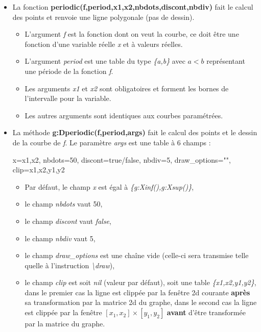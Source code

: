 \begin{itemize}
\item La fonction \textbf{periodic(f,period,x1,x2,nbdots,discont,nbdiv)} fait le calcul des points et renvoie une ligne polygonale (pas de dessin).

  \begin{itemize}
    \item L'argument \emph{f} est la fonction dont on veut la courbe, ce doit être une fonction d'une variable réelle \emph{x} et à valeurs réelles.
    \item L'argument \emph{period} est une table du type \emph{\{a,b\}} avec \(a<b\) représentant une période de la fonction \emph{f}.
    \item Les arguments \emph{x1} et \emph{x2} sont obligatoires et forment les bornes de l'intervalle pour la variable.
    \item Les autres arguments sont identiques aux courbes paramétrées.
  \end{itemize}
\item La méthode \textbf{g:Dperiodic(f,period,args)} fait le calcul des points et le dessin de la courbe de \emph{f}. Le paramètre \emph{args} est une table à 6 champs :

\begin{TeXcode}
  { x={x1,x2}, nbdots=50, discont=true/false, nbdiv=5, draw_options="", clip={x1,x2,y1,y2} }
\end{TeXcode}

  \begin{itemize}
      \item Par défaut, le champ \emph{x} est égal à \emph{\{g:Xinf(),g:Xsup()\}},
      \item le champ \emph{nbdots} vaut 50, 
      \item le champ \emph{discont} vaut \emph{false}, 
      \item le champ \emph{nbdiv} vaut 5, 
      \item le champ \emph{draw\_options} est une chaîne vide (celle-ci sera transmise telle quelle à l'instruction \emph{\textbackslash draw}),
      \item le champ \emph{clip} est soit \emph{nil} (valeur par défaut), soit une table \emph{\{x1,x2,y1,y2\}}, dans le premier cas la ligne est clippée par la fenêtre 2d courante \textbf{après} sa transformation par la matrice 2d du graphe, dans le second cas la ligne est clippée par la fenêtre $[x_1,x_2]\times[y_1,y_2]$ \textbf{avant} d'être transformée par la matrice du graphe.

  \end{itemize}

\end{itemize}

